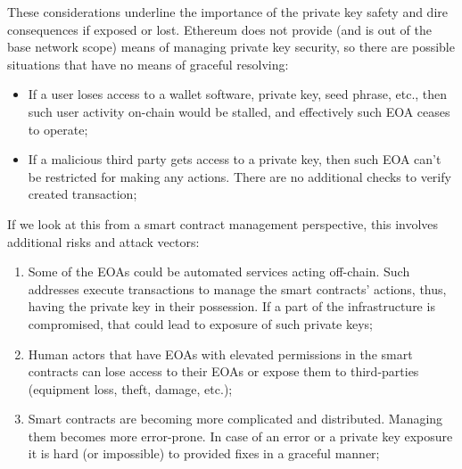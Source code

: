 \documentclass[12pt]{article}
\begin{document}
These considerations underline the importance of the private key safety and dire consequences if exposed or lost. Ethereum does not provide (and is out of the base network scope) means of managing private key security, so there are possible situations that have no means of graceful resolving:
\begin{itemize}
\item{If a user loses access to a wallet software, private key, seed phrase, etc., then such user activity on-chain would be stalled, and effectively such EOA ceases to operate;}
\item{If a malicious third party gets access to a private key, then such EOA can't be restricted for making any actions. There are no additional checks to verify created transaction;}
\end{itemize}

\medskip
If we look at this from a smart contract management perspective, this involves additional risks and attack vectors:
\begin{enumerate}
\item{Some of the EOAs could be automated services acting off-chain. Such addresses execute transactions to manage the smart contracts' actions, thus, having the private key in their possession. If a part of the infrastructure is compromised, that could lead to exposure of such private keys;}
\item{Human actors that have EOAs with elevated permissions in the smart contracts can lose access to their EOAs or expose them to third-parties (equipment loss, theft, damage, etc.);}
\item{Smart contracts are becoming more complicated and distributed. Managing them becomes more error-prone. In case of an error or a private key exposure it is hard (or impossible) to provided fixes in a graceful manner;}
\end{enumerate}
\end{document}
